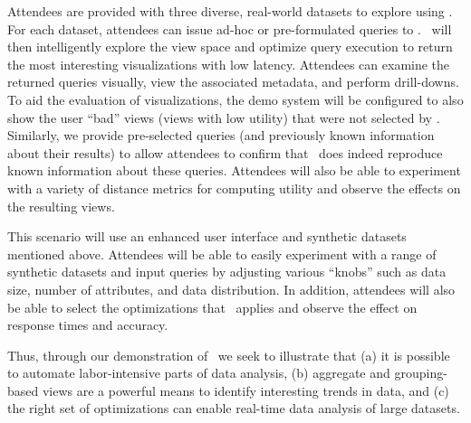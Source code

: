  Attendees are provided with three
diverse, real-world datasets to explore using \SeeDB. For each dataset,
attendees can issue ad-hoc or pre-formulated queries to \SeeDB. \SeeDB\ will
then intelligently explore the view space and optimize query execution to return the
most interesting visualizations with low latency. Attendees can examine the
returned queries visually, view the associated metadata, and perform
drill-downs. To aid the evaluation of visualizations, the demo system will 
be configured to also show the user ``bad'' views (views with low utility) that were not selected
by \SeeDB.
Similarly, we provide pre-selected queries (and
previously known information about their results) to allow attendees to
confirm that \SeeDB\ does indeed reproduce known information about these
queries. Attendees will also be able to experiment with a
variety of distance metrics for computing utility and observe the effects on the
resulting views.


 This scenario
will use an enhanced user interface and synthetic datasets mentioned above.
Attendees will be able to easily experiment with a range of synthetic datasets and input
queries by adjusting various ``knobs'' such as data size, number of attributes, and
data distribution. In addition, attendees will also be able to select the
optimizations that \SeeDB\ applies and observe the effect on response times and
accuracy.

Thus, through our demonstration of \SeeDB\, we seek to illustrate that (a) it is
possible to automate labor-intensive parts of data analysis, (b) aggregate
and grouping-based views are a powerful means to identify interesting trends
in data, and (c) the right set of optimizations can enable real-time data
analysis of large datasets.

